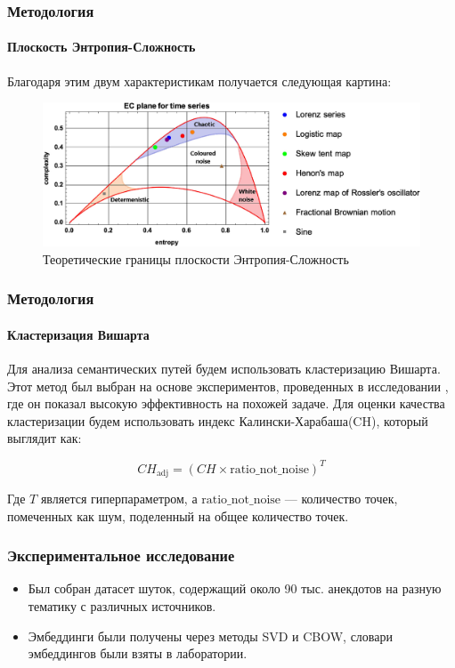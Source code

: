 \documentclass[aspectratio=169]{beamer}
\begin{document}
\begin{frame}
\frametitle{Методология}
\framesubtitle{Плоскость Энтропия-Сложность}
	Благодаря этим двум характеристикам получается следующая картина: \\ 
	 \begin{figure}[htbp]
            \centering
            \includegraphics[scale=0.6]{image2}
            \caption{Теоретические границы плоскости Энтропия-Сложность}
            \label{fig:image2}
        \end{figure}

\end{frame}

\begin{frame}
\frametitle{Методология}
\framesubtitle{Кластеризация Вишарта}

Для анализа семантических путей будем использовать кластеризацию Вишарта\footnotemark[1] \cite{wishart_numerical_1969}. Этот метод был выбран на основе экспериментов, проведенных в исследовании \cite{gromov_spot_2024}, где он показал высокую эффективность на похожей задаче. Для оценки качества кластеризации будем использовать индекс Калински-Харабаша\footnotemark[2] (CH), который выглядит как:

$$
CH_{\text{adj}} = \left( CH \times \text{ratio\_not\_noise} \right)^T
$$

Где $T$ является гиперпараметром, а $\text{ratio\_not\_noise}$ — количество точек, помеченных как шум, поделенный на общее количество точек.


\end{frame}

\begin{frame}
\frametitle{Экспериментальное исследование}
\begin{itemize}
	\item Был собран датасет шуток, содержащий около 90 тыс. анекдотов на разную тематику с различных источников. 
	\item Эмбеддинги были получены через методы SVD и CBOW, словари эмбеддингов были взяты в лаборатории.
\end{itemize}
\end{frame}
\end{document}
